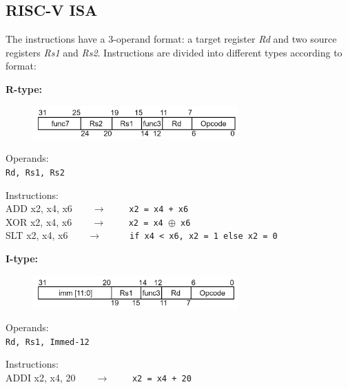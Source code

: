 \subsection{RISC-V ISA}
\label{subsection:ISA}
The instructions have a 3-operand format: a target register \textit{Rd} and two source registers \textit{Rs1} and \textit{Rs2}. Instructions are divided into different types according to format:\\

\begin{description}
	\item \textbf{R-type:}
  \begin{figure}[h]
    \center
    \includegraphics[width=0.7\textwidth]{sec1/images/Rtype.png}
  \end{figure}
	\begin{description}
		\item Operands:\\
		\texttt{Rd, Rs1, Rs2}
		\item Instructions:\\
		\textsf{ADD x2, x4, x6}\ \ \ \ $\longrightarrow$ \ \ \ \ \texttt{x2 = x4 + x6} \\
    \textsf{XOR x2, x4, x6}\ \ \ \ $\longrightarrow$ \ \ \ \ \texttt{x2 = x4 $\oplus$ x6} \\
    \textsf{SLT x2, x4, x6}\ \ \ \ $\longrightarrow$ \ \ \ \ \texttt{ if x4 < x6, x2 = 1 else x2 = 0}
	\end{description}
	\item \textbf{I-type:}
  \begin{figure}[h]
    \center
    \includegraphics[width=0.7\textwidth]{sec1/images/Itype.png}
  \end{figure}
	\begin{description}
		\item Operands:\\
		\texttt{Rd, Rs1, Immed-12}
		\item Instructions:\\
		\textsf{ADDI x2, x4, 20}\ \ \ \ $\longrightarrow$ \ \ \ \ \texttt{x2 = x4 + 20} \\

\end{description}
\end{description}

